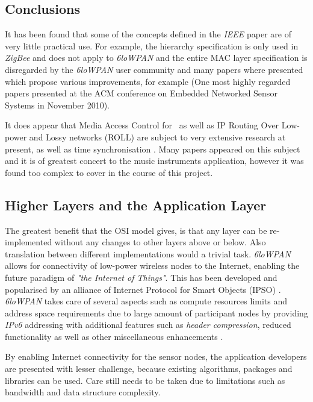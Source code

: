 \subsection{Conclusions}

  It has been found that some of the concepts defined in the \emph{IEEE}
 paper are of very little practical use. For example, the hierarchy
 specification is only used in \emph{ZigBee} and does not apply to
 \emph{6loWPAN} and the entire MAC layer specification is disregarded
 by the \emph{6loWPAN} user community and many papers where presented
 which propose various improvements, for example \cite{paper:amac}
 (One most highly regarded papers presented at the ACM conference
 on Embedded Networked Sensor Systems in November 2010).

 It does appear that Media Access Control for \WPAN\ as well as IP
 Routing Over Low-power and Lossy networks (ROLL) \cite{ietf:draft:roll}
 are subject to very extensive research at present, as well as time
 synchronisation \cite{paper:ts4,paper:ts2,paper:ts3,paper:ts1,
 Lenzen2010Clock, Lenzen2009Optimal, Sommer2009Gradient, Sommer2008Symmetric}.
 Many papers appeared on this subject and it is of greatest concert
 to the music instruments application, however it was found too complex
 to cover in the course of this project.



\subsection{Higher Layers and the Application Layer}

  The greatest benefit that the OSI model gives, is that any layer
 can be re-implemented without any changes to other layers above or
 below. Also translation between different implementations would a
 trivial task. \emph{6loWPAN} allows for connectivity of low-power
 wireless nodes to the Internet, enabling the future paradigm of
 \emph{"the Internet of Things"}. This has been developed and
 popularised by an alliance of Internet Protocol for Smart Objects
 (IPSO) \cite{links:ipso:homepage}. \emph{6loWPAN} takes care of
 several aspects such as compute resources limits and address space
 requirements due to large amount of participant nodes by providing
 \emph{IPv6} addressing with additional features such as \emph{header
 compression}, reduced functionality as well as other miscellaneous
 enhancements \cite{pubs:ipso:wp3, pubs:ipso:wp1}.

  By enabling Internet connectivity for the sensor nodes, the application
 developers are presented with lesser challenge, because existing algorithms,
 packages and libraries can be used. Care still needs to be taken due
 to limitations such as bandwidth and data structure complexity.


